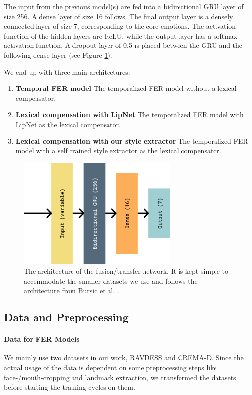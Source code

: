 The input from the previous model(s) are fed into a bidirectional GRU layer of size 256. A dense layer of size 16 follows. The final output layer is a densely connected layer of size 7, corresponding to the core emotions. The activation function of the hidden layers are ReLU, while the output layer has a softmax activation function. A dropout layer of 0.5 is placed between the GRU and the following dense layer (see Figure \ref{fig:fusionlayers}).

We end up with three main architectures:

\begin{enumerate}
    \item \textbf{Temporal FER model} The temporalized FER model without a lexical compensator.
    \item \textbf{Lexical compensation with LipNet} The temporalized FER model with LipNet as the lexical compensator.
    \item \textbf{Lexical compensation with our style extractor} The temporalized FER model with a self trained style extractor as the lexical compensator.
\end{enumerate}

\begin{figure}
    \centering
    \includegraphics[width=0.7\textwidth]{res/FusionLayers.pdf}
    \caption{The architecture of the fusion/transfer network. It is kept simple to accommodate the smaller datasets we use and follows the architecture from Bursic et al. \cite{bursic2020improving}.}
    \label{fig:fusionlayers}
\end{figure}
\subsection{Data and Preprocessing}
\paragraph{Data for FER Models}
We mainly use two datasets in our work, RAVDESS and CREMA-D. Since the actual usage of the data is dependent on some preprocessing steps like face-/mouth-cropping and landmark extraction, we transformed the datasets before starting the training cycles on them.

